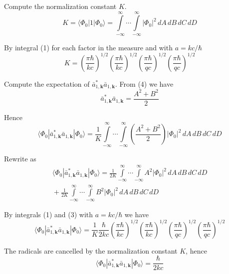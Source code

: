 \documentclass[12pt]{article}
\newcommand\U{\vert\Phi_0\vert^2}
\begin{document}
Compute the normalization constant $K$.
\begin{equation*}
K=\langle\Phi_0|1|\Phi_0\rangle
=\int\limits_{-\infty}^\infty\cdots\int\limits_{-\infty}^\infty
\U\,dA\,dB\,dC\,dD
\end{equation*}

By integral (1) for each factor in the measure and with $a=kc/\hbar$
\begin{equation*}
K=
\left(\frac{\pi\hbar}{kc}\right)^{1/2}
\left(\frac{\pi\hbar}{kc}\right)^{1/2}
\left(\frac{\pi\hbar}{qc}\right)^{1/2}
\left(\frac{\pi\hbar}{qc}\right)^{1/2}
\end{equation*}

Compute the expectation of $\bar a_{1,\mathbf k}^*\bar a_{1,\mathbf k}$.
From (4) we have
\begin{equation*}
\bar a_{1,\mathbf k}^*\bar a_{1,\mathbf k}=\frac{A^2+B^2}{2}
\end{equation*}

Hence
\begin{equation*}
\langle\Phi_0|\bar a_{1,\mathbf k}^*\bar a_{1,\mathbf k}|\Phi_0\rangle
=\frac{1}{K}\int\limits_{-\infty}^\infty\cdots\int\limits_{-\infty}^\infty
\left(\frac{A^2+B^2}{2}\right)
\U\,dA\,dB\,dC\,dD
\end{equation*}

Rewrite as
\begin{multline*}
\langle\Phi_0|\bar a_{1,\mathbf k}^*\bar a_{1,\mathbf k}|\Phi_0\rangle
=\frac{1}{2K}
\int\limits_{-\infty}^\infty\cdots\int\limits_{-\infty}^\infty
A^2
\U\,dA\,dB\,dC\,dD
\\{}+
\frac{1}{2K}
\int\limits_{-\infty}^\infty\cdots\int\limits_{-\infty}^\infty
B^2
\U\,dA\,dB\,dC\,dD
\end{multline*}

By integrals (1) and (3) with $a=kc/\hbar$ we have
\begin{equation*}
\langle\Phi_0|\bar a_{1,\mathbf k}^*\bar a_{1,\mathbf k}|\Phi_0\rangle
=\frac{1}{K}\frac{\hbar}{2kc}
\left(\frac{\pi\hbar}{kc}\right)^{1/2}
\left(\frac{\pi\hbar}{kc}\right)^{1/2}
\left(\frac{\pi\hbar}{qc}\right)^{1/2}
\left(\frac{\pi\hbar}{qc}\right)^{1/2}
\end{equation*}

The radicals are cancelled by the normalization constant $K$, hence
\begin{equation*}
\langle\Phi_0|\bar a_{1,\mathbf k}^*\bar a_{1,\mathbf k}|\Phi_0\rangle=\frac{\hbar}{2kc}
\tag{5}
\end{equation*}
\end{document}
